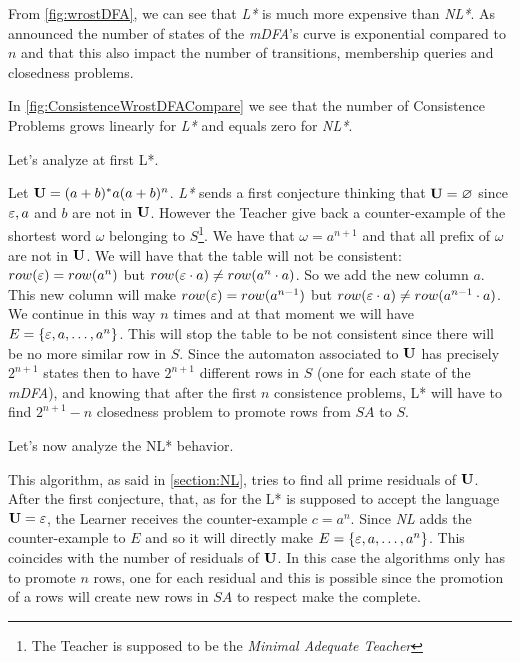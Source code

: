 From \cref{fig:wrostDFA}, we can see that \textit{L*} is much more expensive than \textit{NL*}. As announced the number of states of the \textit{mDFA}'s curve is exponential compared to $n$ and that this also impact the number of transitions, membership queries and closedness problems.

In \cref{fig:ConsistenceWrostDFACompare} we see that the number of Consistence Problems grows linearly for \textit{L*} and equals zero for \textit{NL*}.

Let's analyze at first L*.

Let $\mathbf{U} = (a+b)^*a(a+b)^n$. \textit{L*} sends a first conjecture thinking that $\mathbf{U} = \varnothing$ since $\varepsilon, a$ and $b$ are not in $\mathbf{U}$. However the Teacher give back a counter-example of the shortest word $\omega$ belonging to $S$\footnote{The Teacher is supposed to be the \textit{Minimal Adequate Teacher}}. We have that $\omega = a^{n+1}$ and that all prefix of $\omega$ are not in $\mathbf{U}$. We will have that the table will not be consistent: $row(\varepsilon) = row(a^n)$ but $row(\varepsilon \cdot a) \neq row(a^n \cdot a)$. So we add the new column $a$. This new column will make $row(\varepsilon) = row(a^{n-1})$ but $row(\varepsilon \cdot a) \neq row(a^{n-1} \cdot a)$. We continue in this way $n$ times and at that moment we will have $E = \{\varepsilon, a, \dots, a^n\}$. This will stop the table to be not consistent since there will be no more similar row in $S$. Since the automaton associated to $\mathbf{U}$ has precisely $2^{n+1}$ states then to have $2^{n+1}$ different rows in $S$ (one for each state of the \textit{mDFA}), and knowing that after the first $n$ consistence problems, L* will have to find $2^{n+1}-n$ closedness problem to promote rows from $SA$ to $S$.

Let's now analyze the NL* behavior.

This algorithm, as said in \cref{section:NL}, tries to find all prime residuals of $\mathbf{U}$. After the first conjecture, that, as for the L* is supposed to accept the language $\mathbf{U} = \varepsilon$, the Learner receives the counter-example $c = a^n$. Since \textit{NL} adds the counter-example to $E$ and so it will directly make $E = \{\varepsilon, a, \dots, a^n\}$. This coincides with the number of residuals of $\mathbf{U}$. In this case the  algorithms only has to promote $n$ rows, one for each residual and this is possible since the promotion of a rows will create new rows in $SA$ to respect make the \OT complete.

